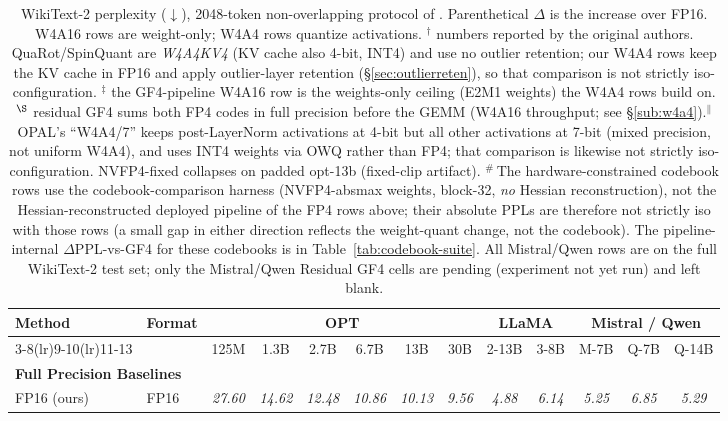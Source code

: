 \begin{table}[t]
\centering
\begingroup
\setlength{\tabcolsep}{2pt}
\scriptsize
\caption{
WikiText-2 perplexity ($\downarrow$), 2048-token non-overlapping protocol
of \cite{frantar2023gptq}. Parenthetical $\Delta$ is the increase over FP16.
W4A16 rows are weight-only; W4A4 rows quantize activations. $^\dagger$ numbers
reported by the original authors. QuaRot/SpinQuant are \emph{W4A4KV4} (KV cache
also 4-bit, INT4) and use no outlier retention; our W4A4 rows keep the KV cache
in FP16 and apply outlier-layer retention (\S\ref{sec:outlierreten}), so that
comparison is not strictly iso-configuration. $^\ddagger$ the GF4-pipeline W4A16
row is the weights-only ceiling (E2M1 weights) the W4A4 rows build on. $^\S$
residual GF4 sums both FP4 codes in full precision before the GEMM (W4A16
throughput; see \S\ref{sub:w4a4}).$^\parallel$ OPAL's ``W4A4/7'' keeps post-LayerNorm activations at 4-bit but all
other activations at 7-bit (mixed precision, not uniform W4A4), and uses INT4
weights via OWQ rather than FP4; that comparison is likewise not strictly
iso-configuration. NVFP4-fixed collapses on padded opt-13b
(fixed-clip artifact).
$^{\#}$\,The hardware-constrained codebook rows use the codebook-comparison
harness (NVFP4-absmax weights, block-32, \emph{no} Hessian reconstruction), not
the Hessian-reconstructed deployed pipeline of the FP4 rows above; their
absolute PPLs are therefore not strictly iso with those rows (a small gap in
either direction reflects the weight-quant change, not the codebook). The
pipeline-internal $\Delta$PPL-vs-GF4 for these codebooks is in
Table~\ref{tab:codebook-suite}. All Mistral/Qwen rows are on the full WikiText-2 test set; only the Mistral/Qwen
Residual GF4 cells are pending (experiment not yet run) and left blank.
}
\label{tab:llm_comparison_clean}
\begin{tabular}{llccccccccccc}
\toprule
\multirow{2}{*}{Method} & \multirow{2}{*}{Format} &
\multicolumn{6}{c}{OPT} &
\multicolumn{2}{c}{LLaMA} &
\multicolumn{3}{c}{Mistral / Qwen} \\
\cmidrule(lr){3-8}\cmidrule(lr){9-10}\cmidrule(lr){11-13}
 & & 125M & 1.3B & 2.7B & 6.7B & 13B & 30B & 2-13B & 3-8B & M-7B & Q-7B & Q-14B \\
\midrule
\multicolumn{13}{l}{\textbf{Full Precision Baselines}} \\
FP16 (ours)
  & FP16
  & \textit{27.60} & \textit{14.62} & \textit{12.48} & \textit{10.86}
  & \textit{10.13} & \textit{9.56} & \textit{4.88} & \textit{6.14}
  & \textit{5.25} & \textit{6.85} & \textit{5.29} \\

\end{tabular}
\end{table}
